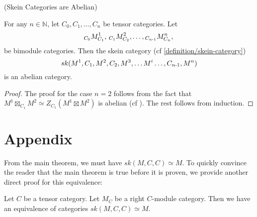\begin{corollary}\label{corollary/skein-category-is-abelian} (Skein Categories are Abelian)

  \noindent For any $n \in \mathbb{N}$, let $C_{0}, C_{1}, \ldots, C_{n}$ be
  tensor categories. Let
  \[
    {}_{C_{0}}M^{1}_{C_{1}}, \, {}_{C_{1}}M^{2}_{C_{2}}, \ldots, {}_{C_{n{\text -}1}}M^{n}_{C_{n}}, \,
  \]
  be bimodule categories. Then the skein category (cf
  \ref{definition/skein-category})
  \[
    sk(M^{1}, C_{1}, M^{2}, C_{2}, M^{3}, \ldots M^{i} \ldots, C_{n{\text -}1}, M^{n})
  \]
  is an abelian category.
\end{corollary}
\begin{proof}
  The proof for the case $n=2$ follows from the fact that
  $M^{1} \boxtimes_{C_{1}} M^{2} \simeq Z_{C_{1}}(M^{1} \boxtimes M^{2})$ is
  abelian (cf \cite{kirillov/fact-homo-4d-tqft}). The rest follows from
  induction.
\end{proof}

\appendix
\section{Appendix}

\noindent From the main theorem, we must have $sk(M,C,C) \simeq M$. To quickly
convince the reader that the main theorem is true before it is proven, we
provide another direct proof for this equivalence:

\begin{proposition} \label{proposition/degenerated-main-theorem}

  \noindent Let $C$ be a tensor category. Let $M_{C}$ be a right $C$-module
  category. \quad Then we have an equivalence of categories
  $sk(M,C,C) \simeq M$.
\end{proposition}


